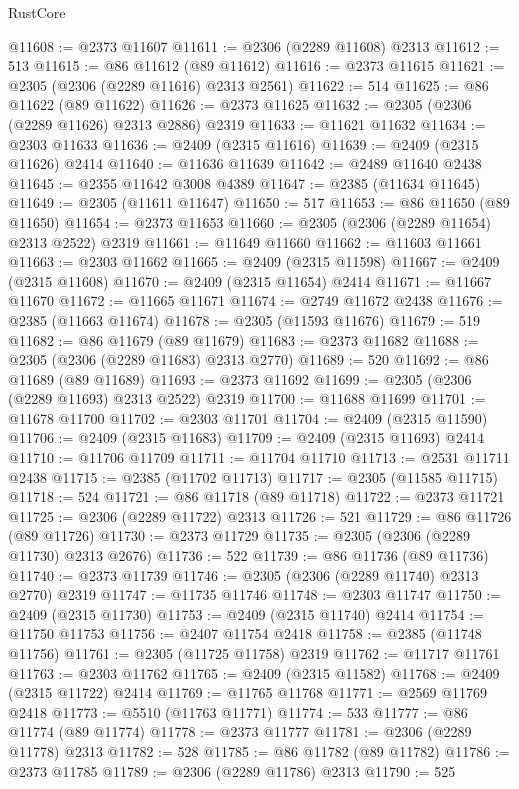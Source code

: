 \begin{lexlean}{RustCore}
\begin{coremodule}
@11608 := @2373 @11607
@11611 := @2306 (@2289 @11608) @2313
@11612 := 513
@11615 := @86 @11612 (@89 @11612)
@11616 := @2373 @11615
@11621 := @2305 (@2306 (@2289 @11616) @2313 @2561)
@11622 := 514
@11625 := @86 @11622 (@89 @11622)
@11626 := @2373 @11625
@11632 := @2305 (@2306 (@2289 @11626) @2313 @2886) @2319
@11633 := @11621 @11632
@11634 := @2303 @11633
@11636 := @2409 (@2315 @11616)
@11639 := @2409 (@2315 @11626) @2414
@11640 := @11636 @11639
@11642 := @2489 @11640 @2438
@11645 := @2355 @11642 @3008 @4389
@11647 := @2385 (@11634 @11645)
@11649 := @2305 (@11611 @11647)
@11650 := 517
@11653 := @86 @11650 (@89 @11650)
@11654 := @2373 @11653
@11660 := @2305 (@2306 (@2289 @11654) @2313 @2522) @2319
@11661 := @11649 @11660
@11662 := @11603 @11661
@11663 := @2303 @11662
@11665 := @2409 (@2315 @11598)
@11667 := @2409 (@2315 @11608)
@11670 := @2409 (@2315 @11654) @2414
@11671 := @11667 @11670
@11672 := @11665 @11671
@11674 := @2749 @11672 @2438
@11676 := @2385 (@11663 @11674)
@11678 := @2305 (@11593 @11676)
@11679 := 519
@11682 := @86 @11679 (@89 @11679)
@11683 := @2373 @11682
@11688 := @2305 (@2306 (@2289 @11683) @2313 @2770)
@11689 := 520
@11692 := @86 @11689 (@89 @11689)
@11693 := @2373 @11692
@11699 := @2305 (@2306 (@2289 @11693) @2313 @2522) @2319
@11700 := @11688 @11699
@11701 := @11678 @11700
@11702 := @2303 @11701
@11704 := @2409 (@2315 @11590)
@11706 := @2409 (@2315 @11683)
@11709 := @2409 (@2315 @11693) @2414
@11710 := @11706 @11709
@11711 := @11704 @11710
@11713 := @2531 @11711 @2438
@11715 := @2385 (@11702 @11713)
@11717 := @2305 (@11585 @11715)
@11718 := 524
@11721 := @86 @11718 (@89 @11718)
@11722 := @2373 @11721
@11725 := @2306 (@2289 @11722) @2313
@11726 := 521
@11729 := @86 @11726 (@89 @11726)
@11730 := @2373 @11729
@11735 := @2305 (@2306 (@2289 @11730) @2313 @2676)
@11736 := 522
@11739 := @86 @11736 (@89 @11736)
@11740 := @2373 @11739
@11746 := @2305 (@2306 (@2289 @11740) @2313 @2770) @2319
@11747 := @11735 @11746
@11748 := @2303 @11747
@11750 := @2409 (@2315 @11730)
@11753 := @2409 (@2315 @11740) @2414
@11754 := @11750 @11753
@11756 := @2407 @11754 @2418
@11758 := @2385 (@11748 @11756)
@11761 := @2305 (@11725 @11758) @2319
@11762 := @11717 @11761
@11763 := @2303 @11762
@11765 := @2409 (@2315 @11582)
@11768 := @2409 (@2315 @11722) @2414
@11769 := @11765 @11768
@11771 := @2569 @11769 @2418
@11773 := @5510 (@11763 @11771)
@11774 := 533
@11777 := @86 @11774 (@89 @11774)
@11778 := @2373 @11777
@11781 := @2306 (@2289 @11778) @2313
@11782 := 528
@11785 := @86 @11782 (@89 @11782)
@11786 := @2373 @11785
@11789 := @2306 (@2289 @11786) @2313
@11790 := 525

\end{coremodule}
\end{lexlean}
